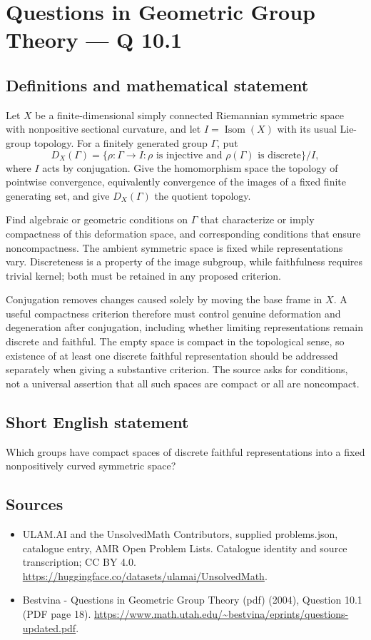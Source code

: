 \documentclass[11pt,a4paper]{article}
\begin{document}
\section*{Questions in Geometric Group Theory — Q 10.1}\label{statement}

\subsection{Definitions and mathematical statement}
Let $X$ be a finite-dimensional simply connected Riemannian symmetric space with nonpositive sectional curvature, and let $I=\operatorname{Isom}(X)$ with its usual Lie-group topology. For a finitely generated group $\Gamma$, put
\[
 D_X(\Gamma)=\{\rho:\Gamma\to I:\rho\text{ is injective and }
                          \rho(\Gamma)\text{ is discrete}\}/I,
\]
where $I$ acts by conjugation. Give the homomorphism space the topology of pointwise convergence, equivalently convergence of the images of a fixed finite generating set, and give $D_X(\Gamma)$ the quotient topology.

Find algebraic or geometric conditions on $\Gamma$ that characterize or imply compactness of this deformation space, and corresponding conditions that ensure noncompactness. The ambient symmetric space is fixed while representations vary. Discreteness is a property of the image subgroup, while faithfulness requires trivial kernel; both must be retained in any proposed criterion.

Conjugation removes changes caused solely by moving the base frame in $X$. A useful compactness criterion therefore must control genuine deformation and degeneration after conjugation, including whether limiting representations remain discrete and faithful. The empty space is compact in the topological sense, so existence of at least one discrete faithful representation should be addressed separately when giving a substantive criterion. The source asks for conditions, not a universal assertion that all such spaces are compact or all are noncompact.
\subsection{Short English statement}
Which groups have compact spaces of discrete faithful representations into a fixed nonpositively curved symmetric space?
\subsection{Sources}
\begin{itemize}
\item[S1] ULAM.AI and the UnsolvedMath Contributors, supplied problems.json, catalogue entry, AMR Open Problem Lists. Catalogue identity and source transcription; CC BY 4.0.
\url{https://huggingface.co/datasets/ulamai/UnsolvedMath}.
\item[S2] Bestvina - Questions in Geometric Group Theory (pdf) (2004), Question 10.1 (PDF page 18). 
\url{https://www.math.utah.edu/~bestvina/eprints/questions-updated.pdf}.
\end{itemize}
\end{document}
